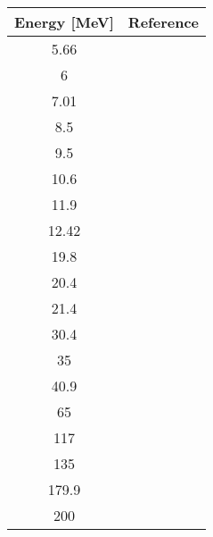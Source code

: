 \begin{tabular}{c c} 
    \toprule
    \bf{Energy [MeV]} & \bf{Reference} \\
    \midrule
    5.66 & \cite{Blue1965}\\
    6 & \cite{Blue1965}\\
    7.01 & \cite{Blue1965}\\
    8.5 & \cite{Blue1965}\\
    9.5 & \cite{Blue1965}\\
    10.6 & \cite{Prior1971}\\
    11.9 & \cite{Blue1965}\\
    12.42 & \cite{Prior1971}\\
    19.8 & \cite{Karban1969}\\
    20.4 & \cite{Karban1969}\\
    21.4 & \cite{Karban1969}\\
    30.4 & \cite{Greaves1972}\\
    35 & \cite{Ohnuma1990}\\
    40.9 & \cite{Alvarez1982}\\
    65 & \cite{Sakaguchi1982}\\
    117 & \cite{Hillman1957}\\
    135 & \cite{Kelly1989}\\
    179.9 & \cite{Kelly1990}\\
    200 & \cite{Glover1985}\\
    \bottomrule
\end{tabular}
